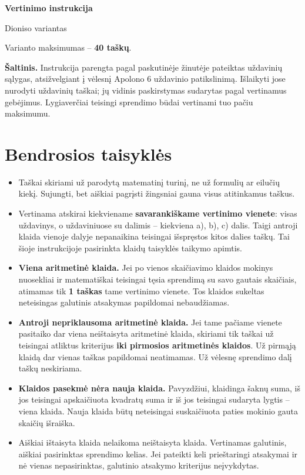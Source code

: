 \documentclass[11pt,a4paper]{article}
\begin{document}
\begin{center}
{\LARGE\bfseries Vertinimo instrukcija}\par
{\large Dioniso variantas}\par
Varianto maksimumas -- \textbf{40 taškų}.
\end{center}
\textbf{Šaltinis.} Instrukcija parengta pagal paskutinėje žinutėje pateiktas uždavinių sąlygas, atsižvelgiant į vėlesnį Apolono 6 uždavinio patikslinimą. Išlaikyti jose nurodyti uždavinių taškai; jų vidinis paskirstymas sudarytas pagal vertinamus gebėjimus. Lygiaverčiai teisingi sprendimo būdai vertinami tuo pačiu maksimumu.

\section*{Bendrosios taisyklės}
\begin{itemize}
\item Taškai skiriami už parodytą matematinį turinį, ne už formulių ar eilučių kiekį. Sujungti, bet aiškiai pagrįsti žingsniai gauna visus atitinkamus taškus.
\item Vertinama atskirai kiekviename \textbf{savarankiškame vertinimo vienete}: visas uždavinys, o uždaviniuose su dalimis -- kiekviena a), b), c) dalis. Taigi antroji klaida vienoje dalyje nepanaikina teisingai išspręstos kitos dalies taškų. Tai šioje instrukcijoje pasirinkta klaidų taisyklės taikymo apimtis.
\item \textbf{Viena aritmetinė klaida.} Jei po vienos skaičiavimo klaidos mokinys nuosekliai ir matematiškai teisingai tęsia sprendimą su savo gautais skaičiais, atimamas tik \textbf{1 taškas} tame vertinimo vienete. Tos klaidos sukeltas neteisingas galutinis atsakymas papildomai nebaudžiamas.
\item \textbf{Antroji nepriklausoma aritmetinė klaida.} Jei tame pačiame vienete pasitaiko dar viena neištaisyta aritmetinė klaida, skiriami tik taškai už teisingai atliktus kriterijus \textbf{iki pirmosios aritmetinės klaidos}. Už pirmąją klaidą dar vienas taškas papildomai neatimamas. Už vėlesnę sprendimo dalį taškų neskiriama.
\item \textbf{Klaidos pasekmė nėra nauja klaida.} Pavyzdžiui, klaidinga šaknų suma, iš jos teisingai apskaičiuota kvadratų suma ir iš jos teisingai sudaryta lygtis -- viena klaida. Nauja klaida būtų neteisingai suskaičiuota paties mokinio gauta skaičių išraiška.
\item Aiškiai ištaisyta klaida nelaikoma neištaisyta klaida. Vertinamas galutinis, aiškiai pasirinktas sprendimo kelias. Jei pateikti keli prieštaringi atsakymai ir nė vienas nepasirinktas, galutinio atsakymo kriterijus neįvykdytas.

\end{itemize}
\end{document}
